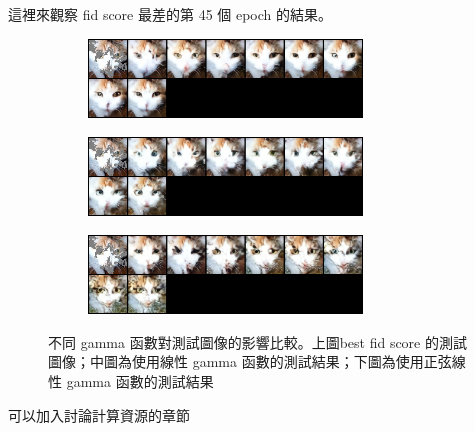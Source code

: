 這裡來觀察 fid score 最差的第 45 個 epoch 的結果。

\begin{figure}[h]
    \centering
    \begin{subfigure}{\textwidth}
        \centering
        \includegraphics[width=0.8\textwidth]{figures/test_69.png}
        \label{fig:mask_test_69}
    \end{subfigure}
    \begin{subfigure}{\textwidth}
        \centering
        \includegraphics[width=0.8\textwidth]{figures/bad-linear-test_69.png}
        \label{fig:bad-linear-test_69}
    \end{subfigure}
    \begin{subfigure}{\textwidth}
        \centering
        \includegraphics[width=0.8\textwidth]{figures/bad-sine-linear-test_69.png}
        \label{fig:bad-sine-linear-test_69}
    \end{subfigure}
    \caption{不同 gamma 函數對測試圖像的影響比較。上圖best fid score 的測試圖像；中圖為使用線性 gamma 函數的測試結果；下圖為使用正弦線性 gamma 函數的測試結果}
    \label{fig:gamma-comparison-test}
\end{figure}



可以加入討論計算資源的章節